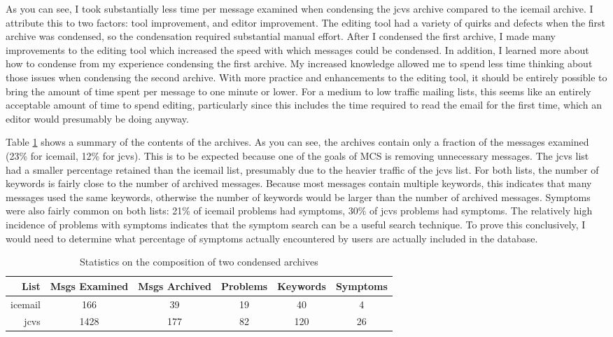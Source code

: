 As you can see, I took substantially less time per message examined when
condensing the jcvs archive compared to the icemail archive. I attribute this
to two factors: tool improvement, and editor improvement. The editing tool had
a variety of quirks and defects when the first archive was condensed, so the
condensation required substantial manual effort. After I condensed the first
archive, I made many improvements to the editing tool which increased the speed
with which messages could be condensed. In addition, I learned more about how
to condense from my experience condensing the first archive. My increased
knowledge allowed me to spend less time thinking about those issues when
condensing the second archive. With more practice and enhancements to the
editing tool, it should be entirely possible to bring the amount of time spent
per message to one minute or lower. For a medium to low traffic mailing lists,
this seems like an entirely acceptable amount of time to spend editing,
particularly since this includes the time required to read the email for the
first time, which an editor would presumably be doing anyway.

Table \ref{tab:archive-stats} shows a summary of the contents of the archives.
As you can see, the archives contain only a fraction of the messages examined
(23\% for icemail, 12\% for jcvs). This is to be expected because one of the
goals of MCS is removing unnecessary messages. The jcvs list had a smaller
percentage retained than the icemail list, presumably due to the heavier
traffic of the jcvs list. For both lists, the number of keywords is fairly
close to the number of archived messages. Because most messages contain
multiple keywords, this indicates that many messages used the same keywords,
otherwise the number of keywords would be larger than the number of archived
messages. Symptoms were also fairly common on both lists: 21\% of icemail
problems had symptoms, 30\% of jcvs problems had symptoms. The relatively high
incidence of problems with symptoms indicates that the symptom search can be a
useful search technique. To prove this conclusively, I would need to determine
what percentage of symptoms actually encountered by users are actually included
in the database.

\begin{table}[htbp]
  \begin{center}
    \caption{Statistics on the composition of two condensed archives}
    \label{tab:archive-stats}
    \begin{tabular} {|r|c|c|c|c|c|} \hline
      {\bf\small List} & {\bf\small Msgs Examined} &
      {\bf\small Msgs Archived} & {\bf\small Problems} &
      {\bf\small Keywords} & {\bf\small Symptoms}\\
      \hline\hline
      icemail & 166 & 39 & 19 & 40 & 4\\ \hline
      jcvs & 1428 & 177 & 82 & 120 & 26\\ \hline
    \end{tabular}
  \end{center}
\end{table}

